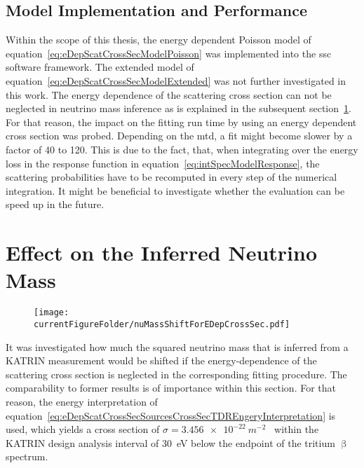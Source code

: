 \FloatBarrier

\subsection{Model Implementation and Performance}
\label{sec:eDepScatCrossSecModelPerformanceAndAccuracy}

Within the scope of this thesis, the energy dependent Poisson model of equation~\eqref{eq:eDepScatCrossSecModelPoisson} was implemented into the \gls{ssc} software framework. The extended model of equation~\eqref{eq:eDepScatCrossSecModelExtended} was not further investigated in this work. The energy dependence of the scattering cross section can not be neglected in neutrino mass inference as is explained in the subsequent section~\ref{sec:eDepScatCrossSecNuMassInf}. For that reason, the impact on the fitting run time by using an energy dependent cross section was probed. Depending on the \gls{mtd}, a fit might become slower by a factor of 40 to 120. This is due to the fact, that, when integrating over the energy loss in the response function in equation~\eqref{eq:intSpecModelResponse}, the scattering probabilities have to be recomputed in every step of the numerical integration. It might be beneficial to investigate whether the evaluation can be speed up in the future.


\section{Effect on the Inferred Neutrino Mass}
\label{sec:eDepScatCrossSecNuMassInf}
\begin{figure}[t]
\texttt{[image: \\currentFigureFolder/nuMassShiftForEDepCrossSec.pdf]}
        \label{fig:eDepScatCrossSecNuMassInfShifts}
\end{figure}
It was investigated how much the squared neutrino mass that is inferred from a KATRIN measurement would be shifted if the energy-dependence of the scattering cross section is neglected in the corresponding fitting procedure. The comparability to former results is of importance within this section. For that reason, the energy interpretation of equation~\ref{eq:eDepScatCrossSecSourcesCrossSecTDREngeryInterpretation} is used, which yields a cross section of $\sigma=\SI{3.456e-22}{m^{-2}}$~\cite{Angrik:2005ep} within the KATRIN design analysis interval of \SI{30}{eV} below the endpoint of the tritium $\upbeta$ spectrum.


